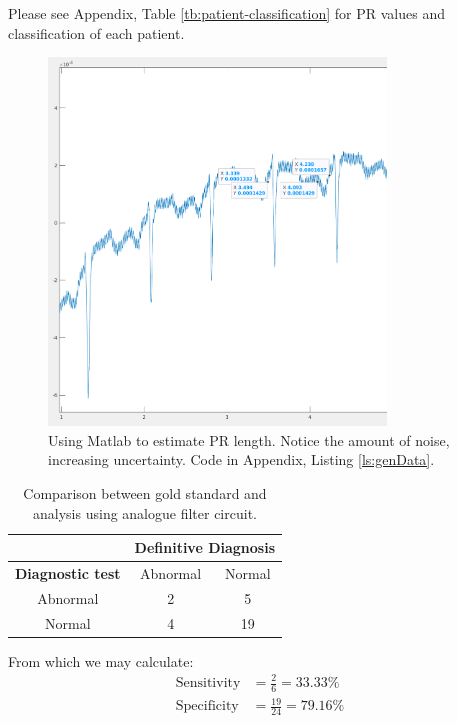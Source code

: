 Please see Appendix, Table \ref{tb:patient-classification} for PR values and classification of each patient.

\begin{figure}[h]
    \centering
    \includegraphics[width=0.8\textwidth]{Defining_PR.png}
    \caption{Using Matlab to estimate PR length. Notice the amount of noise, increasing uncertainty. Code in Appendix, Listing \ref{ls:genData}.}
    \label{}
\end{figure}

\begin{table}[h]
    \centering
\begin{tabular} {ccc}
& \multicolumn{2}{c}{\textbf{Definitive Diagnosis}} \\
\toprule
\textbf{Diagnostic test} &   Abnormal & Normal \\
\midrule
Abnormal        &      2    & 5 \\
Normal          &      4    & 19 \\
\bottomrule
\end{tabular}
\caption{Comparison between gold standard and analysis using analogue filter circuit.}
\end{table}
From which we may calculate:
\begin{equation}
\begin{split}
    \text{Sensitivity} &= \frac{2}{6} = 33.33\% \\
    \text{Specificity} &= \frac{19}{24} = 79.16\%
\end{split}
\end{equation}


